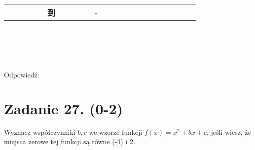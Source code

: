 \documentclass[10pt]{article}
\begin{document}
\begin{center}
\begin{tabular}{|c|c|c|c|c|c|c|c|c|c|c|c|c|c|c|c|c|c|c|c|c|c|c|}
\hline
 &  &  &  &  & 到 &  &  &  &  & - &  &  &  &  &  &  &  &  &  &  &  &  \\
\hline
 &  &  &  &  &  &  &  &  &  &  &  &  &  &  &  &  &  &  &  &  &  &  \\
\hline
 &  &  &  &  &  &  &  &  &  &  &  &  &  &  &  &  &  &  &  &  &  &  \\
\hline
 &  &  &  &  &  &  &  &  &  &  &  &  &  &  &  &  &  &  &  &  &  &  \\
\hline
 &  &  &  &  &  &  &  &  &  &  &  &  &  &  &  &  &  &  &  &  &  &  \\
\hline
 &  &  &  &  &  &  &  &  &  &  &  &  &  &  &  &  &  &  &  &  &  &  \\
\hline
 &  &  &  &  &  &  &  &  &  &  &  &  &  &  &  &  &  &  &  &  &  &  \\
\hline
 &  &  &  &  &  &  &  &  &  &  &  &  &  &  &  &  &  &  &  &  &  &  \\
\hline
 &  &  &  &  &  &  &  &  &  &  &  &  &  &  &  &  &  &  &  &  &  &  \\
\hline
 &  &  &  &  &  &  &  &  &  &  &  &  &  &  &  &  &  &  &  &  &  &  \\
\hline
 &  &  &  &  &  &  &  &  &  &  &  &  &  &  &  &  &  &  &  &  &  &  \\
\hline
 &  &  &  &  &  &  &  &  &  &  &  &  &  &  &  &  &  &  &  &  &  &  \\
\hline
 &  &  &  &  &  &  &  &  &  &  &  &  &  &  &  &  &  &  &  &  &  &  \\
\hline
 &  &  &  &  &  &  &  &  &  &  &  &  &  &  &  &  &  &  &  &  &  &  \\
\hline
 &  &  &  &  &  &  &  &  &  &  &  &  &  &  &  &  &  &  &  &  &  &  \\
\hline
\end{tabular}
\end{center}

Odpowiedź: \(\qquad\)

\section*{Zadanie 27. (0-2)}
Wyznacz współczynniki \(b, c\) we wzorze funkcji \(f(x)=x^{2}+b x+c\), jeśli wiesz, że miejsca zerowe tej funkcji są równe (-4) i 2.
\end{document}
